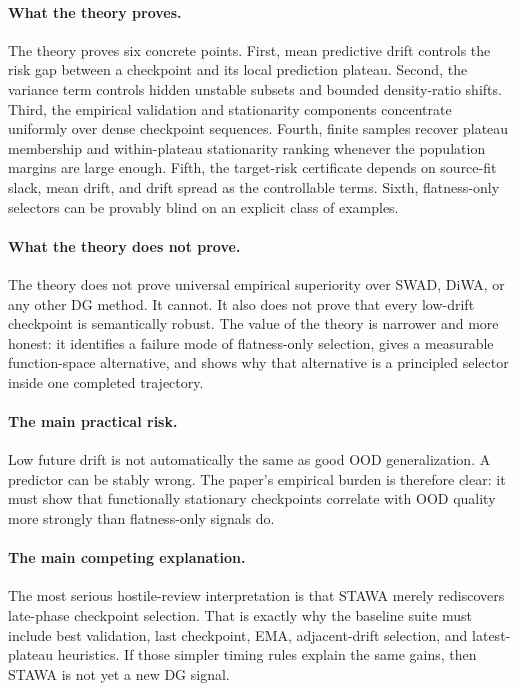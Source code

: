 \documentclass{article}
\newcommand{\ood}{OOD}
\newcommand{\stawa}{\textup{\textsc{STAWA}}}
\newcommand{\swad}{\textup{\textsc{SWAD}}}
\begin{document}
\paragraph{What the theory proves.}
The theory proves six concrete points. First, mean predictive drift controls the risk gap between a checkpoint and its local prediction plateau. Second, the variance term controls hidden unstable subsets and bounded density-ratio shifts. Third, the empirical validation and stationarity components concentrate uniformly over dense checkpoint sequences. Fourth, finite samples recover plateau membership and within-plateau stationarity ranking whenever the population margins are large enough. Fifth, the target-risk certificate depends on source-fit slack, mean drift, and drift spread as the controllable terms. Sixth, flatness-only selectors can be provably blind on an explicit class of examples.

\paragraph{What the theory does not prove.}
The theory does not prove universal empirical superiority over \swad{}, DiWA, or any other DG method. It cannot. It also does not prove that every low-drift checkpoint is semantically robust. The value of the theory is narrower and more honest: it identifies a failure mode of flatness-only selection, gives a measurable function-space alternative, and shows why that alternative is a principled selector inside one completed trajectory.

\paragraph{The main practical risk.}
Low future drift is not automatically the same as good \ood{} generalization. A predictor can be stably wrong. The paper's empirical burden is therefore clear: it must show that functionally stationary checkpoints correlate with \ood{} quality more strongly than flatness-only signals do.

\paragraph{The main competing explanation.}
The most serious hostile-review interpretation is that \stawa{} merely rediscovers late-phase checkpoint selection. That is exactly why the baseline suite must include best validation, last checkpoint, EMA, adjacent-drift selection, and latest-plateau heuristics. If those simpler timing rules explain the same gains, then \stawa{} is not yet a new DG signal.
\end{document}
